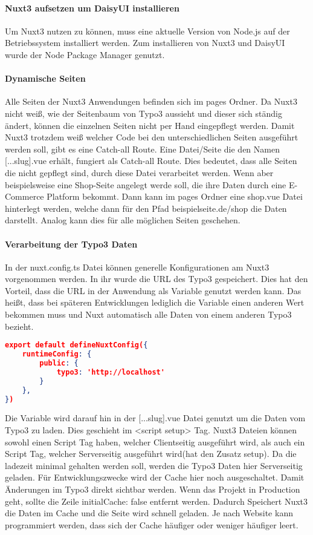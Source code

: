 \paragraph{Nuxt3 aufsetzen um DaisyUI installieren}
Um Nuxt3 nutzen zu können, muss eine aktuelle Version von Node.js auf der Betriebssystem installiert werden. Zum installieren von Nuxt3 und DaisyUI wurde der Node Package Manager genutzt.

\paragraph{Dynamische Seiten}
Alle Seiten der Nuxt3 Anwendungen befinden sich im pages Ordner. Da Nuxt3 nicht weiß, wie der Seitenbaum von Typo3 aussieht und dieser sich ständig ändert, können die einzelnen Seiten nicht per Hand eingepflegt werden. Damit Nuxt3 trotzdem weiß welcher Code bei den unterschiedlichen Seiten ausgeführt werden soll, gibt es eine Catch-all Route. Eine Datei/Seite die den Namen [...slug].vue erhält, fungiert als Catch-all Route. Dies bedeutet, dass alle Seiten die nicht gepflegt sind, durch diese Datei verarbeitet werden. Wenn aber beispielsweise eine Shop-Seite angelegt werde soll, die ihre Daten durch eine E-Commerce Platform bekommt. Dann kann im pages Ordner eine shop.vue Datei hinterlegt werden, welche dann für den Pfad beispielseite.de/shop die Daten darstellt. Analog kann dies für alle möglichen Seiten geschehen.

\paragraph{Verarbeitung der Typo3 Daten}

In der nuxt.config.ts Datei können generelle Konfigurationen am Nuxt3 vorgenommen werden. In ihr wurde die URL des Typo3 gespeichert. Dies hat den Vorteil, dass die URL in der Anwendung als Variable genutzt werden kann. Das heißt, dass bei späteren Entwicklungen lediglich die Variable einen anderen Wert bekommen muss und Nuxt automatisch alle Daten von einem anderen Typo3 bezieht.

\begin{lstlisting}[language=json,firstnumber=1]
export default defineNuxtConfig({
    runtimeConfig: {
        public: {
            typo3: 'http://localhost'
        }
    },
})
\end{lstlisting}

Die Variable wird darauf hin in der [...slug].vue Datei genutzt um die Daten vom Typo3 zu laden. Dies geschieht im <script setup> Tag. Nuxt3 Dateien können sowohl einen Script Tag haben, welcher Clientseitig ausgeführt wird, als auch ein Script Tag, welcher Serverseitig ausgeführt wird(hat den Zusatz setup). Da die ladezeit minimal gehalten werden soll, werden die Typo3 Daten hier Serverseitig geladen. Für \newline Entwicklungszwecke wird der Cache hier noch ausgeschaltet. Damit Änderungen im Typo3 direkt sichtbar werden. Wenn das Projekt in Production geht, sollte die Zeile {initialCache: false} entfernt werden. Dadurch Speichert Nuxt3 die Daten im Cache und die Seite wird schnell geladen. Je nach Website kann programmiert werden, dass sich der Cache häufiger oder weniger häufiger leert.

